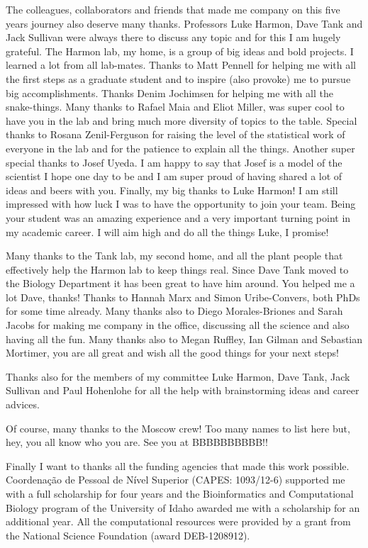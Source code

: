 The colleagues, collaborators and friends that made me company on this five years journey also deserve many thanks. Professors Luke Harmon, Dave Tank and Jack Sullivan were always there to discuss any topic and for this I am hugely grateful. The Harmon lab, my home, is a group of big ideas and bold projects. I learned a lot from all lab-mates. Thanks to Matt Pennell for helping me with all the first steps as a graduate student and to inspire (also provoke) me to pursue big accomplishments. Thanks Denim Jochimsen for helping me with all the snake-things. Many thanks to Rafael Maia and Eliot Miller, was super cool to have you in the lab and bring much more diversity of topics to the table. Special thanks to Rosana Zenil-Ferguson for raising the level of the statistical work of everyone in the lab and for the patience to explain all the things. Another super special thanks to Josef Uyeda. I am happy to say that Josef is a model of the scientist I hope one day to be and I am super proud of having shared a lot of ideas and beers with you. Finally, my big thanks to Luke Harmon! I am still impressed with how luck I was to have the opportunity to join your team. Being your student was an amazing experience and a very important turning point in my academic career. I will aim high and do all the things Luke, I promise!

Many thanks to the Tank lab, my second home, and all the plant people that effectively help the Harmon lab to keep things real. Since Dave Tank moved to the Biology Department it has been great to have him around. You helped me a lot Dave, thanks! Thanks to Hannah Marx and Simon Uribe-Convers, both PhDs for some time already. Many thanks also to Diego Morales-Briones and Sarah Jacobs for making me company in the office, discussing all the science and also having all the fun. Many thanks also to Megan Ruffley, Ian Gilman and Sebastian Mortimer, you are all great and wish all the good things for your next steps!

Thanks also for the members of my committee Luke Harmon, Dave Tank, Jack Sullivan and Paul Hohenlohe for all the help with brainstorming ideas and career advices.

Of course, many thanks to the Moscow crew! Too many names to list here but, hey, you all know who you are. See you at BBBBBBBBBB!!

Finally I want to thanks all the funding agencies that made this work possible. Coordenação de Pessoal de Nível Superior (CAPES: 1093/12-6) supported me with a full scholarship for four years and the Bioinformatics and Computational Biology program of the University of Idaho awarded me with a scholarship for an additional year. All the computational resources were provided by a grant from the National Science Foundation (award DEB-1208912).


